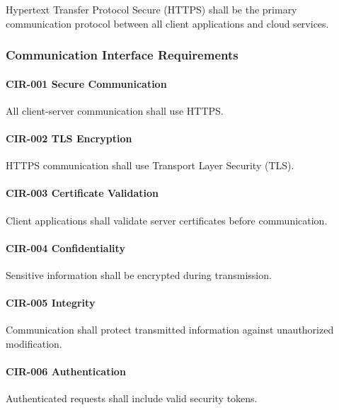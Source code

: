 Hypertext Transfer Protocol Secure (HTTPS) shall be the primary
communication protocol between all client applications and cloud
services.


\subsubsection*{Communication Interface Requirements}

\paragraph{CIR-001 Secure Communication}

All client-server communication shall use HTTPS.

\paragraph{CIR-002 TLS Encryption}

HTTPS communication shall use Transport Layer Security (TLS).

\paragraph{CIR-003 Certificate Validation}

Client applications shall validate server certificates before
communication.

\paragraph{CIR-004 Confidentiality}

Sensitive information shall be encrypted during transmission.

\paragraph{CIR-005 Integrity}

Communication shall protect transmitted information against
unauthorized modification.

\paragraph{CIR-006 Authentication}

Authenticated requests shall include valid security tokens.


